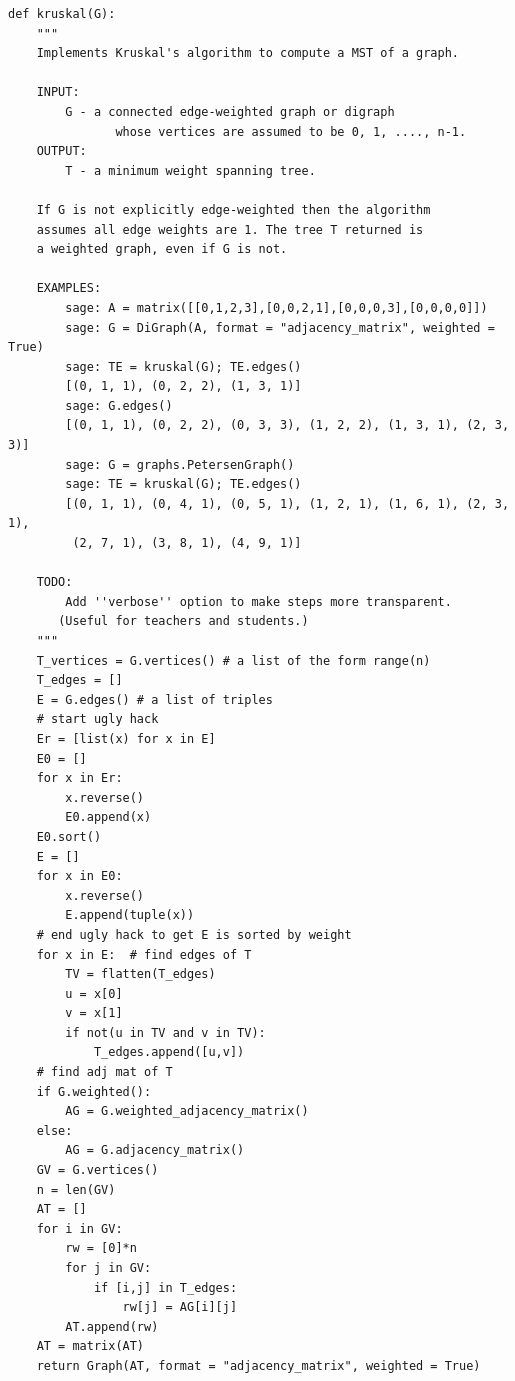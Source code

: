 \begin{lstlisting}
def kruskal(G):
    """
    Implements Kruskal's algorithm to compute a MST of a graph.

    INPUT:
        G - a connected edge-weighted graph or digraph
               whose vertices are assumed to be 0, 1, ...., n-1.
    OUTPUT:
        T - a minimum weight spanning tree.

    If G is not explicitly edge-weighted then the algorithm
    assumes all edge weights are 1. The tree T returned is
    a weighted graph, even if G is not.

    EXAMPLES:
        sage: A = matrix([[0,1,2,3],[0,0,2,1],[0,0,0,3],[0,0,0,0]])
        sage: G = DiGraph(A, format = "adjacency_matrix", weighted = True)
        sage: TE = kruskal(G); TE.edges()
        [(0, 1, 1), (0, 2, 2), (1, 3, 1)]
        sage: G.edges()
        [(0, 1, 1), (0, 2, 2), (0, 3, 3), (1, 2, 2), (1, 3, 1), (2, 3, 3)]
        sage: G = graphs.PetersenGraph()
        sage: TE = kruskal(G); TE.edges()
        [(0, 1, 1), (0, 4, 1), (0, 5, 1), (1, 2, 1), (1, 6, 1), (2, 3, 1),
         (2, 7, 1), (3, 8, 1), (4, 9, 1)]

    TODO:
        Add ''verbose'' option to make steps more transparent.
       (Useful for teachers and students.)
    """
    T_vertices = G.vertices() # a list of the form range(n)
    T_edges = []
    E = G.edges() # a list of triples
    # start ugly hack
    Er = [list(x) for x in E]
    E0 = []
    for x in Er:
        x.reverse()
        E0.append(x)
    E0.sort()
    E = []
    for x in E0:
        x.reverse()
        E.append(tuple(x))
    # end ugly hack to get E is sorted by weight
    for x in E:  # find edges of T
        TV = flatten(T_edges)
        u = x[0]
        v = x[1]
        if not(u in TV and v in TV):
            T_edges.append([u,v])
    # find adj mat of T
    if G.weighted():
        AG = G.weighted_adjacency_matrix()
    else:
        AG = G.adjacency_matrix()
    GV = G.vertices()
    n = len(GV)
    AT = []
    for i in GV:
        rw = [0]*n
        for j in GV:
            if [i,j] in T_edges:
                rw[j] = AG[i][j]
        AT.append(rw)
    AT = matrix(AT)
    return Graph(AT, format = "adjacency_matrix", weighted = True)
\end{lstlisting}

